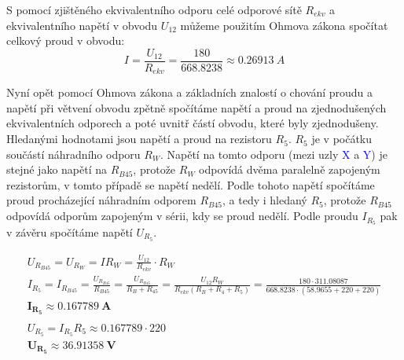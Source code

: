 S pomocí zjištěného ekvivalentního odporu celé odporové sítě $R_{ekv}$ a ekvivalentního napětí v obvodu $U_{12}$ můžeme použitím Ohmova zákona spočítat celkový proud v obvodu:
\[
    I = \frac{U_{12}}{R_{ekv}} = \frac{180}{\num{668.8238}} \approx \SI{0.26913}{A}
\]

Nyní opět pomocí Ohmova zákona a základních znalostí o chování proudu a napětí při větvení obvodu zpětně spočítáme napětí a proud na zjednodušených ekvivalentních odporech a poté uvnitř částí obvodu, které byly zjednodušeny. Hledanými hodnotami jsou napětí a proud na rezistoru $R_5$. $R_5$ je v počátku součástí náhradního odporu $R_W$. Napětí na tomto odporu (mezi uzly \textcolor{blue}{X} a \textcolor{blue}{Y}) je stejné jako napětí na $R_{B45}$, protože $R_W$ odpovídá dvěma paralelně zapojeným rezistorům, v tomto případě se napětí nedělí. Podle tohoto napětí spočítáme proud procházející náhradním odporem $R_{B45}$, a tedy i hledaný $R_5$, protože $R_{B45}$ odpovídá odporům zapojeným v sérii, kdy se proud nedělí. Podle proudu $I_{R_5}$ pak v závěru spočítáme napětí $U_{R_5}$.

\begin{gather*}
    U_{R_{B45}} = U_{R_W} = IR_W = \frac{U_{12}}{R_{ekv}} \cdot R_W \\
    I_{R_5} = I_{R_{B45}} = \frac{U_{R_{B45}}}{R_{B45}} = \frac{U_{R_{B45}}}{R_B + R_{45}} = \frac{U_{12} R_W}{R_{ekv}(R_B+R_4+R_5)} = \frac{180\cdot \num{311.08087}}{\num{668.8238}\cdot (\num{58.9655}+220+220)} \\
    \mathbf{I_{R_5} \approx \SI{0.167789}{\ampere}} \\
    \\
    U_{R_5} = I_{R_5} R_5 \approx \num{0.167789}\cdot 220 \\
    \mathbf{U_{R_5} \approx \SI{36.91358}{\volt}}
\end{gather*}